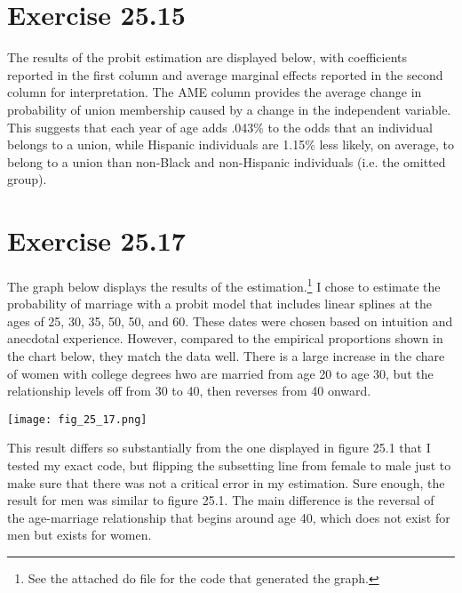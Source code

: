 \documentclass{article}
\begin{document}
\pagebreak
\section*{Exercise 25.15}
The results of the probit estimation are displayed below, with coefficients reported in the first column and average marginal effects reported in the second column for interpretation. The AME column provides the average change in probability of union membership caused by a change in the independent variable. This suggests that each year of age adds .043\% to the odds that an individual belongs to a union, while Hispanic individuals are 1.15\% less likely, on average, to belong to a union than non-Black and non-Hispanic individuals (i.e. the omitted group).

\begin{center}
	
\end{center}

\pagebreak
\section*{Exercise 25.17}
The graph below displays the results of the estimation.\footnote{See the attached do file for the code that generated the graph.} I chose to estimate the probability of marriage with a probit model that includes linear splines at the ages of 25, 30, 35, 50, 50, and 60. These dates were chosen based on intuition and anecdotal experience. However, compared to the empirical proportions shown in the chart below, they match the data well. There is a large increase in the chare of women with college degrees hwo are married from age 20 to age 30, but the relationship levels off from 30 to 40, then reverses from 40 onward.
\begin{center}
	\texttt{[image: fig\_25\_17.png]}
\end{center}
This result differs so substantially from the one displayed in figure 25.1 that I tested my exact code, but flipping the subsetting line from female to male just to make sure that there was not a critical error in my estimation. Sure enough, the result for men was similar to figure 25.1. The main difference is the reversal of the age-marriage relationship that begins around age 40, which does not exist for men but exists for women.

\end{document}
